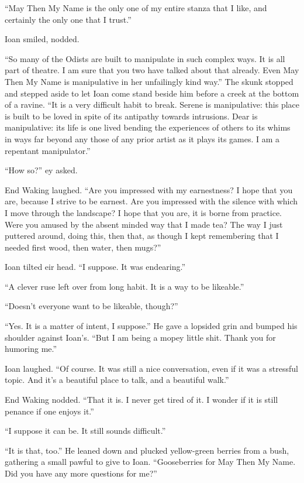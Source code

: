 ``May Then My Name is the only one of my entire stanza that I like, and certainly the only one that I trust.''

Ioan smiled, nodded.

``So many of the Odists are built to manipulate in such complex ways. It is all part of theatre. I am sure that you two have talked about that already. Even May Then My Name is manipulative in her unfailingly kind way.'' The skunk stopped and stepped aside to let Ioan come stand beside him before a creek at the bottom of a ravine. ``It is a very difficult habit to break. Serene is manipulative: this place is built to be loved in spite of its antipathy towards intrusions. Dear is manipulative: its life is one lived bending the experiences of others to its whims in ways far beyond any those of any prior artist as it plays its games. I am a repentant manipulator.''

``How so?'' ey asked.

End Waking laughed. ``Are you impressed with my earnestness? I hope that you are, because I strive to be earnest. Are you impressed with the silence with which I move through the landscape? I hope that you are, it is borne from practice. Were you amused by the absent minded way that I made tea? The way I just puttered around, doing this, then that, as though I kept remembering that I needed first wood, then water, then mugs?''

Ioan tilted eir head. ``I suppose. It was endearing.''

``A clever ruse left over from long habit. It is a way to be likeable.''

``Doesn't everyone want to be likeable, though?''

``Yes. It is a matter of intent, I suppose.'' He gave a lopsided grin and bumped his shoulder against Ioan's. ``But I am being a mopey little shit. Thank you for humoring me.''

Ioan laughed. ``Of course. It was still a nice conversation, even if it was a stressful topic. And it's a beautiful place to talk, and a beautiful walk.''

End Waking nodded. ``That it is. I never get tired of it. I wonder if it is still penance if one enjoys it.''

``I suppose it can be. It still sounds difficult.''

``It is that, too.'' He leaned down and plucked yellow-green berries from a bush, gathering a small pawful to give to Ioan. ``Gooseberries for May Then My Name. Did you have any more questions for me?''

